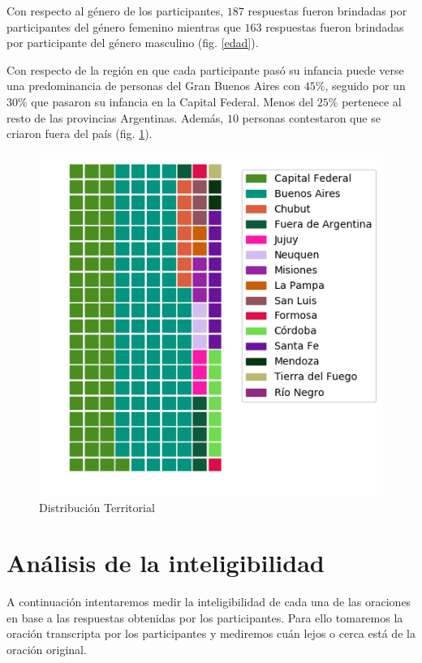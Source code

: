 Con respecto al género de los participantes, $187$ respuestas fueron brindadas por participantes del género femenino mientras que $163$ respuestas fueron brindadas por participante del género masculino (fig. \ref{edad}).

Con respecto de la región en que cada participante pasó su infancia puede verse una predominancia de personas del Gran Buenos Aires con $45\%$, seguido por un $30\%$ que pasaron su infancia en la Capital Federal. Menos del $25\%$ pertenece al resto de las provincias Argentinas. Además, $10$ personas contestaron que se criaron fuera del país (fig. \ref{distTerritorial}).

\begin{figure}
\begin{center}
\includegraphics[scale=0.8]{datosDemograficos/infancia.png}
\end{center}
\caption{Distribución Territorial}
\label{distTerritorial}
\end{figure}

\section{Análisis de la inteligibilidad}\label{SeccionInteligibilidad}

A continuación intentaremos medir la inteligibilidad de cada una de las oraciones en base a las respuestas obtenidas por los participantes. Para ello tomaremos la oración transcripta por los participantes y mediremos cuán lejos o cerca está de la oración original. 

